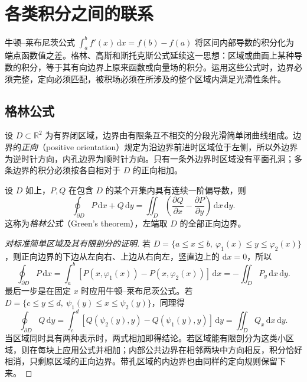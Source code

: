 \documentclass[UTF8,12pt,a4paper,fontset=fandol]{ctexbook}
\begin{document}
\section{各类积分之间的联系}
\label{sec:relations-among-types-of-integrals}

牛顿--莱布尼茨公式 $\int_a^bf'(x)\,\mathrm dx=f(b)-f(a)$ 将区间内部导数的积分化为端点函数值之差。格林、高斯和斯托克斯公式延续这一思想：区域或曲面上某种导数的积分，等于其有向边界上原来函数或向量场的积分。运用这些公式时，边界必须完整，定向必须匹配，被积场必须在所涉及的整个区域内满足光滑性条件。

\subsection{格林公式}
\label{subsec:green-formula}

设 $D\subset\mathbb R^2$ 为有界闭区域，边界由有限条互不相交的分段光滑简单闭曲线组成。边界的\emph{正向}（positive orientation）规定为沿边界前进时区域位于左侧，所以外边界为逆时针方向，内孔边界为顺时针方向。只有一条外边界时区域没有平面孔洞；多条边界的积分必须按各自相对于 $D$ 的正向相加。

\begin{theorem}[格林公式]
\label{thm:green-formula}
设 $D$ 如上，$P,Q$ 在包含 $D$ 的某个开集内具有连续一阶偏导数，则
\begin{equation}
\label{eq:green-formula}
    \oint_{\partial D}P\,\mathrm dx+Q\,\mathrm dy
    =\iint_D\left(\frac{\partial Q}{\partial x}-\frac{\partial P}{\partial y}\right)
      \,\mathrm dx\,\mathrm dy.
\end{equation}
这称为\emph{格林公式}（Green's theorem），左端取 $D$ 的全部正向边界。
\end{theorem}

\begin{proof}[对标准简单区域及其有限剖分的证明]
若 $D=\{a\leq x\leq b,\ \varphi_1(x)\leq y\leq\varphi_2(x)\}$，则正向边界的下边从左向右、上边从右向左，竖直边上的 $\mathrm dx=0$，所以
\[
    \oint_{\partial D}P\,\mathrm dx
    =\int_a^b[P(x,\varphi_1(x))-P(x,\varphi_2(x))]\,\mathrm dx
    =-\iint_D P_y\,\mathrm dx\,\mathrm dy.
\]
最后一步是在固定 $x$ 时应用牛顿--莱布尼茨公式。若 $D=\{c\leq y\leq d,\ \psi_1(y)\leq x\leq\psi_2(y)\}$，同理得
\[
    \oint_{\partial D}Q\,\mathrm dy
    =\int_c^d[Q(\psi_2(y),y)-Q(\psi_1(y),y)]\,\mathrm dy
    =\iint_D Q_x\,\mathrm dx\,\mathrm dy.
\]
当区域同时具有两种表示时，两式相加即得结论。若区域能有限剖分为这类小区域，则在每块上应用公式并相加；内部公共边界在相邻两块中方向相反，积分恰好相消，只剩原区域的正向边界。带孔区域的内边界也由同样的定向规则保留下来。
\end{proof}
\end{document}
